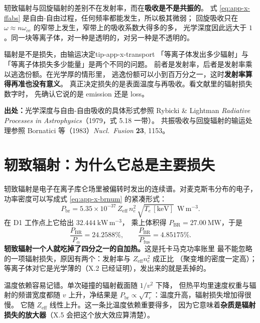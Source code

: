 轫致辐射与回旋辐射的差别不在发射率，而在\textbf{吸收是不是共振的}。
式 \eqref{eq:app-x-ffabs} 是自由-自由过程，任何频率都能发生，所以极其微弱；
回旋吸收只在 $\omega\approx n\omega_{ce}$ 的窄带上发生，窄带上的吸收系数大得多的多，
光学深度因此远大于 $1$。同一块等离子体，对一种是透明的，对另一种是不透明的。

\begin{tip}{辐射是不是损失，由输运决定}{tip-app-x-transport}
「等离子体发出多少辐射」与「等离子体损失多少能量」是两个不同的问题。
前者是发射率，后者是发射率乘以逃逸份额。在光学厚的情形里，
逃逸份额可以小到百万分之一，这时\textbf{发射率算得再准也没有意义}。
真正决定损失的是表面温度与再吸收。看文献里的辐射损失数字时，
先确认它说的是 emission 还是 loss。
\end{tip}

{\footnotesize
\textbf{出处：}光学深度与自由-自由吸收的具体形式参照 Rybicki \& Lightman
\emph{Radiative Processes in Astrophysics}（1979，式 5.18 一带）。
共振吸收与回旋辐射的输运处理参照 Bornatici 等（1983）\emph{Nucl.\ Fusion} \textbf{23}, 1153。
}

\section{轫致辐射：为什么它总是主要损失}
\label{sec:app-x-brems}

轫致辐射是电子在离子库仑场里被偏转时发出的连续谱。对麦克斯韦分布的电子，
功率密度可以写成式 \eqref{eq:app-x-brnum} 的紧凑形式：
\begin{equation}
P_{\mathrm{br}} = 5.35\times10^{-37}\,Z_{\mathrm{eff}}\,n_e^2\,
\sqrt{T_e\,[\mathrm{keV}]}\ \ \mathrm{W\,m^{-3}}.
\label{eq:app-x-br}
\end{equation}
在 D1 工作点上它给出 $32.444\ \mathrm{kW\,m^{-3}}$，
乘上体积得 $P_{\mathrm{BR}}=27.00\ \mathrm{MW}$，于是
\begin{equation}
\frac{P_{\mathrm{BR}}}{P_\alpha} = 24.2588\%,
\qquad
\frac{P_{\mathrm{BR}}}{P_{\mathrm{fus}}} = 4.85175\%.
\label{eq:app-x-brfrac}
\end{equation}
\textbf{轫致辐射一个人就吃掉了四分之一的自加热。}这是托卡马克功率账里
最不能忽略的一项辐射损失，原因有两个：发射率与 $Z_{\mathrm{eff}}n_e^2$ 成正比
（聚变堆的密度一定高）；等离子体对它是光学薄的（X.2 已经证明），发出来的就是丢掉的。

温度依赖容易记错。单次碰撞的辐射截面随 $1/v^2$ 下降，
但热平均里速度权重与辐射的频谱宽度都随 $v$ 上升，净结果是
$P_{\mathrm{br}}\propto\sqrt{T_e}$：温度升高，辐射损失增加得很慢。
它随 $Z_{\mathrm{eff}}$ 线性上升。这一条比温度依赖重要得多，
因为它意味着\textbf{杂质是辐射损失的放大器}（X.5 会把这个放大效应算清楚）。

